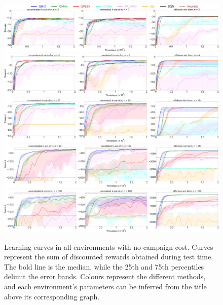 \begin{figure}
\includegraphics[width=\textwidth]{tex_thesis/figures/ch5/all_3_cc_False.pdf}
\includegraphics[width=\textwidth]{tex_thesis/figures/ch5/all_5_cc_False.pdf}
\includegraphics[width=\textwidth]{tex_thesis/figures/ch5/all_10_cc_False.pdf}
\includegraphics[width=\textwidth]{tex_thesis/figures/ch5/all_50_cc_False.pdf}
\includegraphics[width=\textwidth]{tex_thesis/figures/ch5/all_100_cc_False.pdf}
\caption{
Learning curves in all environments with no campaign cost. 
Curves represent the sum of discounted rewards obtained during test time.
The bold line is the median, while the 25th and 75th percentiles delimit the error bands.
Colours represent the different methods, and each environment's parameters can be inferred from the title above its corresponding graph.
}
\label{fig:learning_curves_cc_false}
\end{figure}

